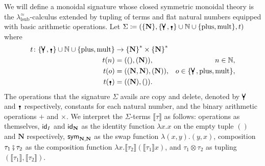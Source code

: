 We will define a monoidal signature whose closed symmetric monoidal theory is the $\lambda^\approx_{\text{lsub}}$-calculus extended by tupling of terms and flat natural numbers equipped with basic arithmetic operations.
Let $\Sigma \coloneq (\{ \mathbf{N} \}, \{ \comonoid, \counit \} \cup \mathbb{N} \cup \{ \text{plus}, \text{mult} \}, t)$ where
\begin{align*}
	t\colon \{ \comonoid, \counit \} \cup \mathbb{N} \cup \{ \text{plus}, \text{mult} \} & \to {\{ \mathbf{N} \}}^* \times {\{ \mathbf{N} \}}^*                                                    \\
	t(n)                                                                                 & = ((), (\mathbf{N})),                                & n \in \mathbb{N},                                \\
	t(o)                                                                                 & = ((\mathbf{N}, \mathbf{N}), (\mathbf{N})),          & o \in \{ \comonoid, \text{plus}, \text{mult} \}, \\
	t(\counit)                                                                           & = ((\mathbf{N}), ()).
\end{align*}
The operations that the signature $\Sigma$ avails are copy and delete, denoted by $\comonoid$ and $\counit$ respectively, constants for each natural number, and the binary arithmetic operations $+$ and $\times$.
We interpret the $\Sigma$-terms $\llbracket \tau \rrbracket$ as follows: operations as themselves, $\textsf{id}_{I}$ and $\textsf{id}_{\mathbf{N}}$ as the identity function $\lambda x. x$ on the empty tuple $()$ and $\mathbf{N}$ respectively, $\textsf{sym}_{\mathbf{N}, \mathbf{N}}$ as the swap function $\lambda (x, y). (y, x)$, composition $\tau_1 \fatsemi \tau_2$ as the composition function $\lambda x. \llbracket \tau_2 \rrbracket \left(\llbracket \tau_1 \rrbracket x\right)$, and $\tau_1 \otimes \tau_2$ as tupling $\left(\llbracket \tau_1 \rrbracket, \llbracket \tau_2 \rrbracket\right)$.

